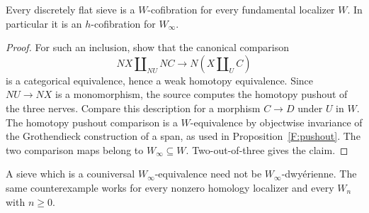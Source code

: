 \begin{proposition}\label{F:DFh}
Every discretely flat sieve is a $W$-cofibration for every
fundamental localizer $W$. In particular it is an $h$-cofibration
for $W_\infty$.
\end{proposition}

\begin{proof}
For such an inclusion, \citet[Theorem~1.5, in its generalized
form]{F_HORR2024} show that the canonical comparison
\[
 NX\amalg_{NU}NC\longrightarrow N(X\amalg_U C)
\]
is a categorical equivalence, hence a weak homotopy equivalence.
Since $NU\to NX$ is a monomorphism, the source computes the
homotopy pushout of the three nerves. Compare this description
for a morphism $C\to D$ under $U$ in $W$. The homotopy pushout
comparison is a $W$-equivalence by objectwise invariance of the
Grothendieck construction of a span, as used in
Proposition~\ref{F:pushout}. The two comparison maps belong to
$W_\infty\subseteq W$. Two-out-of-three gives the claim.
\end{proof}

\begin{theorem}
\label{F:C035}
A sieve which is a couniversal $W_\infty$-equivalence need not be
$W_\infty$-dwy\'erienne. The same counterexample works for every
nonzero homology localizer and every $W_n$ with $n\geq0$.
\end{theorem}

